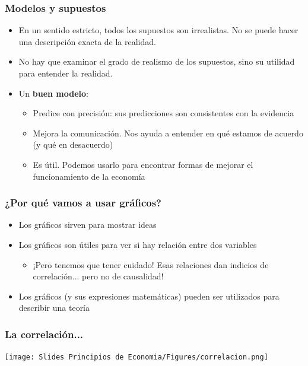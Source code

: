 \documentclass{beamer}
\begin{document}
\begin{frame}
    \frametitle{Modelos y supuestos}
    \begin{itemize}
        \item En un sentido estricto, todos los supuestos son irrealistas. No se puede hacer una descripción exacta de la realidad. \vspace{2mm}
        \item No hay que examinar el grado de realismo de los supuestos, sino su utilidad para entender la realidad. \vspace{2mm}
        \item Un \textbf{buen modelo}: 
    \begin{itemize}
        \item Predice con precisión: sus predicciones son consistentes con la evidencia \vspace{1mm}
        \item Mejora la comunicación. Nos ayuda a entender en qué estamos de acuerdo (y qué en desacuerdo) 
        \item Es útil. Podemos usarlo para encontrar formas de mejorar el funcionamiento de la economía
    \end{itemize}
    \end{itemize}
\end{frame}


\begin{frame}
    \frametitle{¿Por qué vamos a usar gráficos?}
    \begin{itemize}
        \item Los gráficos sirven para mostrar ideas \vspace{2mm}
        \item Los gráficos son útiles para ver si hay relación entre dos variables 
         \begin{itemize}
            \item ¡Pero tenemos que tener cuidado! Esas relaciones dan indicios de correlación... pero no de causalidad! \vspace{2mm}
        \end{itemize}
        \item Los gráficos (y sus expresiones matemáticas) pueden ser utilizados para describir una teoría
    \end{itemize} 
\end{frame}

\begin{frame}
    \frametitle{La correlación...}
    \begin{center}
        \texttt{[image: Slides Principios de Economia/Figures/correlacion.png]}
    \end{center}
\end{frame}
\end{document}
